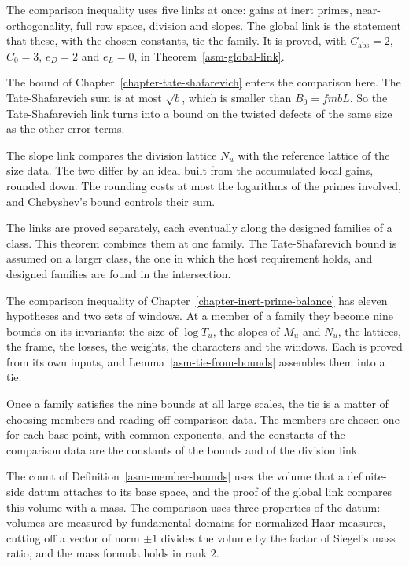 The comparison inequality uses five links at once: gains at inert primes,
near-orthogonality, full row space, division and slopes. The global link is
the statement that these, with the chosen constants, tie the family. It is
proved, with $C_{\mathrm{abs}}=2$, $C_0=3$, $e_D=2$ and $e_L=0$, in
Theorem~\ref{asm-global-link}.

The bound of Chapter~\ref{chapter-tate-shafarevich} enters the comparison
here. The Tate-Shafarevich sum is at most $\sqrt b$, which is smaller than
$B_0=fmbL$. So the Tate-Shafarevich link turns into a bound on the twisted
defects of the same size as the other error terms.

The slope link compares the division lattice $N_u$ with the reference lattice
of the size data. The two differ by an ideal built from the accumulated local
gains, rounded down. The rounding costs at most the logarithms of the primes
involved, and Chebyshev's bound controls their sum.

The links are proved separately, each eventually along the designed families
of a class. This theorem combines them at one family. The Tate-Shafarevich
bound is assumed on a larger class, the one in which the host requirement
holds, and designed families are found in the intersection.

The comparison inequality of Chapter~\ref{chapter-inert-prime-balance} has
eleven hypotheses and two sets of windows. At a member of a family they become
nine bounds on its invariants: the size of $\log T_u$, the slopes of $M_u$ and
$N_u$, the lattices, the frame, the losses, the weights, the characters and
the windows. Each is proved from its own inputs, and
Lemma~\ref{asm-tie-from-bounds} assembles them into a tie.

Once a family satisfies the nine bounds at all large scales, the tie is a
matter of choosing members and reading off comparison data. The members are
chosen one for each base point, with common exponents, and the constants of
the comparison data are the constants of the bounds and of the division link.

The count of Definition~\ref{asm-member-bounds} uses the volume that a
definite-side datum attaches to its base space, and the proof of the global
link compares this volume with a mass. The comparison uses three properties of
the datum: volumes are measured by fundamental domains for normalized Haar
measures, cutting off a vector of norm $\pm1$ divides the volume by the factor
of Siegel's mass ratio, and the mass formula holds in rank $2$.


